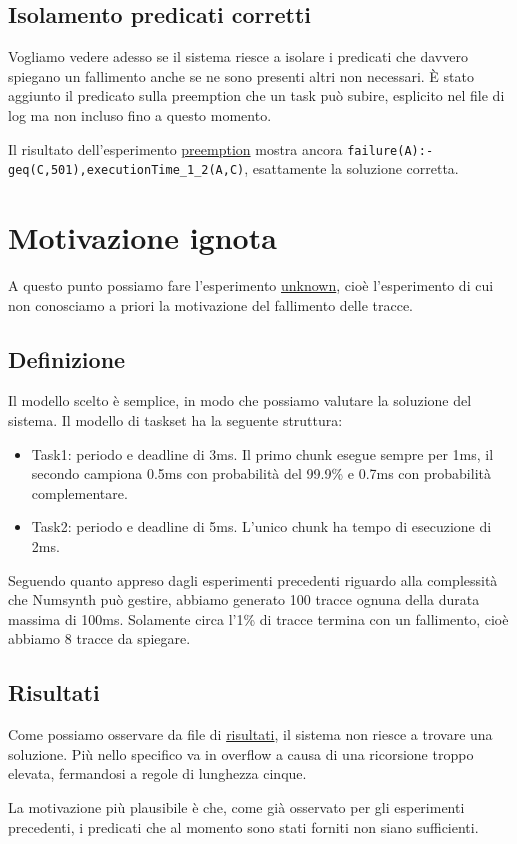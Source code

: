 \subsection{Isolamento predicati corretti}
\label{subsec:preempt}
Vogliamo vedere adesso se il sistema riesce a isolare i predicati che davvero spiegano un fallimento anche se ne sono presenti altri non necessari. È stato aggiunto il predicato sulla preemption che un task può subire, esplicito nel file di log ma non incluso fino a questo momento.

Il risultato dell'esperimento \href{https://github.com/edoardosarri24/prediction-in-data-driven-system/tree/main/my-experiments/12-preemption}{preemption} mostra ancora \texttt{failure(A):- \\ geq(C,501),executionTime\_1\_2(A,C)}, esattamente la soluzione corretta.

\section{Motivazione ignota}
\label{sec:unknown}
A questo punto possiamo fare l'esperimento \href{https://github.com/edoardosarri24/prediction-in-data-driven-system/tree/main/my-experiments/13-unknown}{unknown}, cioè l'esperimento di cui non conosciamo a priori la motivazione del fallimento delle tracce.

\subsection{Definizione}
Il modello scelto è semplice, in modo che possiamo valutare la soluzione del sistema. Il modello di taskset ha la seguente struttura:
\begin{itemize}
    \item Task1: periodo e deadline di 3ms. Il primo chunk esegue sempre per 1ms, il secondo campiona 0.5ms con probabilità del 99.9\% e 0.7ms con probabilità complementare.
    \item Task2: periodo e deadline di 5ms. L'unico chunk ha tempo di esecuzione di 2ms.
\end{itemize}

Seguendo quanto appreso dagli esperimenti precedenti riguardo alla complessità che Numsynth può gestire, abbiamo generato 100 tracce ognuna della durata massima di 100ms. Solamente circa l'1\% di tracce termina con un fallimento, cioè abbiamo 8 tracce da spiegare.

\subsection{Risultati}
Come possiamo osservare da file di \href{https://github.com/edoardosarri24/prediction-in-data-driven-system/blob/main/my-experiments/13-unknown/result.txt}{risultati}, il sistema non riesce a trovare una soluzione. Più nello specifico va in overflow a causa di una ricorsione troppo elevata, fermandosi a regole di lunghezza cinque.

La motivazione più plausibile è che, come già osservato per gli esperimenti precedenti, i predicati che al momento sono stati forniti non siano sufficienti.